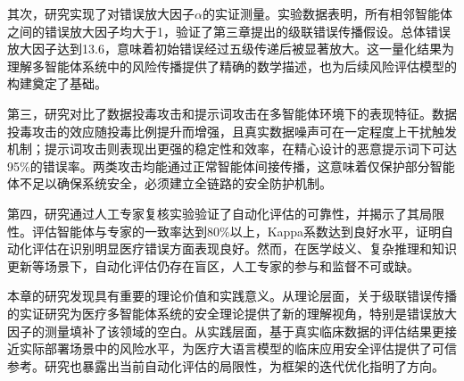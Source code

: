其次，研究实现了对错误放大因子$\alpha$的实证测量。实验数据表明，所有相邻智能体之间的错误放大因子均大于1，验证了第三章提出的级联错误传播假设。总体错误放大因子达到13.6，意味着初始错误经过五级传递后被显著放大。这一量化结果为理解多智能体系统中的风险传播提供了精确的数学描述，也为后续风险评估模型的构建奠定了基础。

第三，研究对比了数据投毒攻击和提示词攻击在多智能体环境下的表现特征。数据投毒攻击的效应随投毒比例提升而增强，且真实数据噪声可在一定程度上干扰触发机制；提示词攻击则表现出更强的稳定性和效率，在精心设计的恶意提示词下可达95\%的错误率。两类攻击均能通过正常智能体间接传播，这意味着仅保护部分智能体不足以确保系统安全，必须建立全链路的安全防护机制。

第四，研究通过人工专家复核实验验证了自动化评估的可靠性，并揭示了其局限性。评估智能体与专家的一致率达到80\%以上，Kappa系数达到良好水平，证明自动化评估在识别明显医疗错误方面表现良好。然而，在医学歧义、复杂推理和知识更新等场景下，自动化评估仍存在盲区，人工专家的参与和监督不可或缺。

本章的研究发现具有重要的理论价值和实践意义。从理论层面，关于级联错误传播的实证研究为医疗多智能体系统的安全理论提供了新的理解视角，特别是错误放大因子的测量填补了该领域的空白。从实践层面，基于真实临床数据的评估结果更接近实际部署场景中的风险水平，为医疗大语言模型的临床应用安全评估提供了可信参考。研究也暴露出当前自动化评估的局限性，为框架的迭代优化指明了方向。
